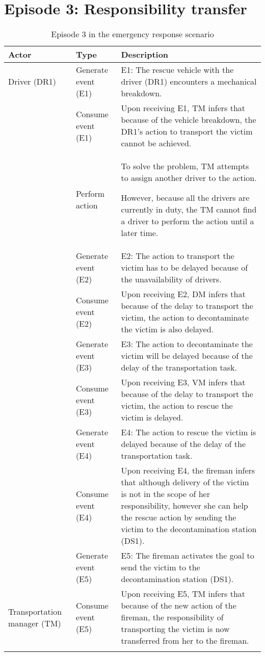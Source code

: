 \section{Episode 3: Responsibility transfer} %
\label{sec:episode_3_responsibility_transfer}
\footnotesize
{
\begin{longtable}{>{\raggedright}p{1.2in}>{\raggedright}p{1.2in}>{\raggedright}p{3in}}
\toprule 
\textbf{Actor} & \textbf{Type} & \textbf{Description}\tabularnewline
\midrule 
Driver (DR1) & Generate event (E1) & E1: The rescue vehicle with the driver (DR1) encounters a mechanical
breakdown.\tabularnewline
\midrule 
\multirow{3}{1.2in}{Transportation manager (TM)} & Consume event (E1) & Upon receiving E1, TM infers that because of the vehicle breakdown,
the DR1's action to transport the victim cannot be achieved.\tabularnewline
\cmidrule{2-3} 
 & Perform action & To solve the problem, TM attempts to assign another driver to the
action.

However, because all the drivers are currently in duty, the TM cannot
find a driver to perform the action until a later time.\tabularnewline
\cmidrule{2-3} 
 & Generate event (E2) & E2: The action to transport the victim has to be delayed because of
the unavailability of drivers.\tabularnewline
\midrule 
\multirow{2}{1.2in}{Decontamination manager (DM)} & Consume event (E2) & Upon receiving E2, DM infers that because of the delay to transport
the victim, the action to decontaminate the victim is also delayed.\tabularnewline
\cmidrule{2-3} 
 & Generate event (E3) & E3: The action to decontaminate the victim will be delayed because
of the delay of the transportation task.\tabularnewline
\midrule 
\multirow{2}{1.2in}{Victim manager (VM)} & Consume event (E3) & Upon receiving E3, VM infers that because of the delay to transport
the victim, the action to rescue the victim is delayed.\tabularnewline
\cmidrule{2-3} 
 & Generate event (E4) & E4: The action to rescue the victim is delayed because of the delay
of the transportation task.\tabularnewline
\midrule 
\multirow{2}{1.2in}{Fireman} & Consume event (E4) & Upon receiving E4, the fireman infers that although delivery of the
victim is not in the scope of her responsibility, however she can
help the rescue action by sending the victim to the decontamination
station (DS1). \tabularnewline
\cmidrule{2-3} 
 & Generate event (E5) & E5: The fireman activates the goal to send the victim to the decontamination
station (DS1). \tabularnewline
\midrule 
Transportation manager (TM) & Consume event (E5) & Upon receiving E5, TM infers that because of the new action of the
fireman, the responsibility of transporting the victim is now transferred
from her to the fireman.\tabularnewline
\bottomrule
\caption{Episode 3 in the emergency response scenario}
\label{tab:episode_3_appendix}
\end{longtable}
}

